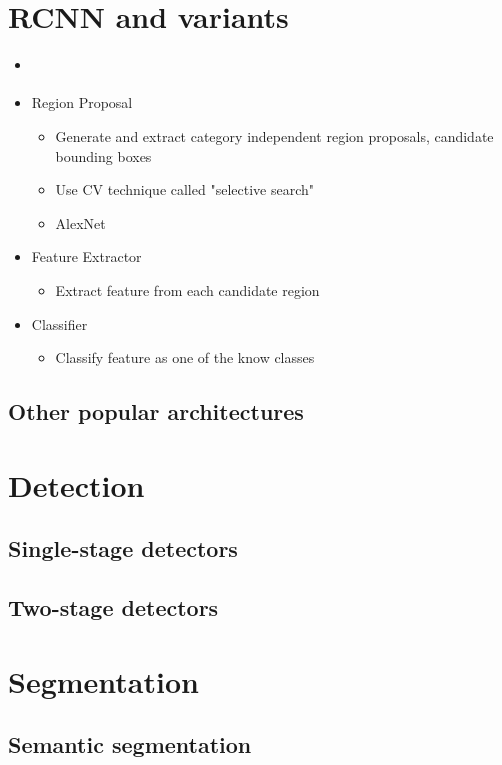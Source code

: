 \documentclass[../main.tex]{subfiles}
\begin{document}
\section{RCNN and variants}
\begin{itemize}
  \item \cite{rcnn}
  \item Region Proposal
  \begin{itemize}
    \item Generate and extract category independent region proposals, candidate bounding boxes
    \item Use CV technique called "selective search"
    \item AlexNet
  \end{itemize}

  \item Feature Extractor
  \begin{itemize}
    \item Extract feature from each candidate region
  \end{itemize}

  \item Classifier
  \begin{itemize}
    \item Classify feature as one of the know classes
  \end{itemize}

\end{itemize}

\subsection{Other popular architectures}

\section{Detection}
\subsection{Single-stage detectors}
\subsection{Two-stage detectors}

\section{Segmentation}
\subsection{Semantic segmentation}
\end{document}
